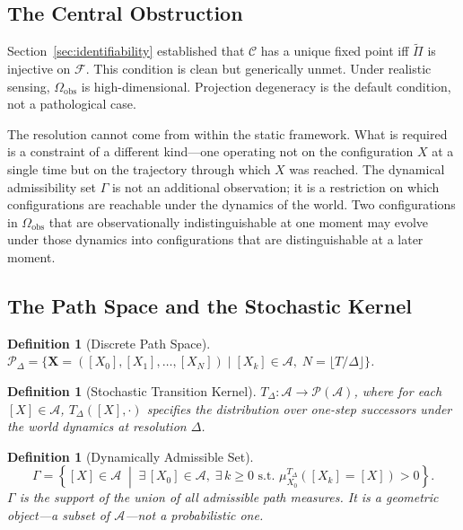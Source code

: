 \documentclass[11pt, oneside]{article}
\newtheorem{definition}[theorem]{Definition}
\newcommand{\Ftil}{\widetilde{\Pi}}
\begin{document}
\subsection{The Central Obstruction}

Section~\ref{sec:identifiability} established that $\mathcal{C}$ has a unique fixed point
iff $\Ftil$ is injective on $\mathcal{F}$. This condition is clean but generically unmet.
Under realistic sensing, $\Omega_{\mathrm{obs}}$ is high-dimensional. Projection degeneracy
is the default condition, not a pathological case.

The resolution cannot come from within the static framework. What is required is a
constraint of a different kind---one operating not on the configuration $X$ at a single
time but on the trajectory through which $X$ was reached. The dynamical admissibility set
$\Gamma$ is not an additional observation; it is a restriction on which configurations are
reachable under the dynamics of the world. Two configurations in $\Omega_{\mathrm{obs}}$
that are observationally indistinguishable at one moment may evolve under those dynamics
into configurations that are distinguishable at a later moment.

\subsection{The Path Space and the Stochastic Kernel}

\begin{definition}[Discrete Path Space]
$\mathcal{P}_\Delta = \{ \mathbf{X} = ([X_0],[X_1],\ldots,[X_N]) \mid [X_k] \in \mathcal{A},\;
N = \lfloor T/\Delta \rfloor \}$.
\end{definition}

\begin{definition}[Stochastic Transition Kernel]
$T_\Delta : \mathcal{A} \to \mathcal{P}(\mathcal{A})$, where for each $[X] \in \mathcal{A}$,
$T_\Delta([X],\cdot)$ specifies the distribution over one-step successors under the world
dynamics at resolution $\Delta$.
\end{definition}

\begin{definition}[Dynamically Admissible Set]
\[
\Gamma = \left\{ [X] \in \mathcal{A} \;\middle|\;
\exists\, [X_0] \in \mathcal{A},\; \exists\, k \ge 0 \text{ s.t. }
\mu_{X_0}^{T_\Delta}([X_k] = [X]) > 0 \right\}.
\]
$\Gamma$ is the support of the union of all admissible path measures. It is a geometric
object---a subset of $\mathcal{A}$---not a probabilistic one.
\end{definition}
\end{document}
